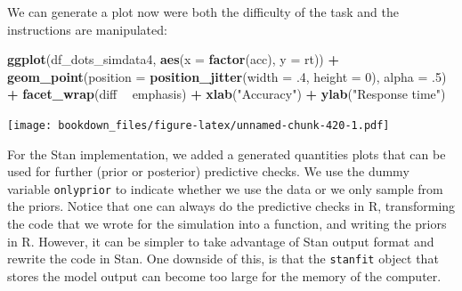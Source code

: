 \documentclass[12pt,]{krantz}
\newenvironment{Shaded}{\begin{snugshade}}{\end{snugshade}}
\newcommand{\KeywordTok}[1]{\textcolor[rgb]{0.13,0.29,0.53}{\textbf{#1}}}
\newcommand{\DataTypeTok}[1]{\textcolor[rgb]{0.13,0.29,0.53}{#1}}
\newcommand{\DecValTok}[1]{\textcolor[rgb]{0.00,0.00,0.81}{#1}}
\newcommand{\FloatTok}[1]{\textcolor[rgb]{0.00,0.00,0.81}{#1}}
\newcommand{\StringTok}[1]{\textcolor[rgb]{0.31,0.60,0.02}{#1}}
\newcommand{\OperatorTok}[1]{\textcolor[rgb]{0.81,0.36,0.00}{\textbf{#1}}}
\newcommand{\NormalTok}[1]{#1}
\theoremstyle{definition}
\theoremstyle{definition}
\theoremstyle{definition}
\theoremstyle{remark}
\begin{document}
We can generate a plot now were both the difficulty of the task and the
instructions are manipulated:

\begin{Shaded}
\begin{Highlighting}[]
\KeywordTok{ggplot}\NormalTok{(df_dots_simdata4, }\KeywordTok{aes}\NormalTok{(}\DataTypeTok{x =} \KeywordTok{factor}\NormalTok{(acc), }\DataTypeTok{y =}\NormalTok{ rt)) }\OperatorTok{+}
\StringTok{  }\KeywordTok{geom_point}\NormalTok{(}\DataTypeTok{position =} \KeywordTok{position_jitter}\NormalTok{(}\DataTypeTok{width =} \FloatTok{.4}\NormalTok{, }\DataTypeTok{height =} \DecValTok{0}\NormalTok{),}
             \DataTypeTok{alpha =} \FloatTok{.5}\NormalTok{) }\OperatorTok{+}
\StringTok{  }\KeywordTok{facet_wrap}\NormalTok{(diff }\OperatorTok{~}\StringTok{ }\NormalTok{emphasis) }\OperatorTok{+}
\StringTok{  }\KeywordTok{xlab}\NormalTok{(}\StringTok{"Accuracy"}\NormalTok{) }\OperatorTok{+}
\StringTok{  }\KeywordTok{ylab}\NormalTok{(}\StringTok{"Response time"}\NormalTok{)}
\end{Highlighting}
\end{Shaded}

\texttt{[image: bookdown\_files/figure-latex/unnamed-chunk-420-1.pdf]}

For the Stan implementation, we added a generated quantities plots that
can be used for further (prior or posterior) predictive checks. We use
the dummy variable \texttt{onlyprior} to indicate whether we use the
data or we only sample from the priors. Notice that one can always do
the predictive checks in R, transforming the code that we wrote for the
simulation into a function, and writing the priors in R. However, it can
be simpler to take advantage of Stan output format and rewrite the code
in Stan. One downside of this, is that the \texttt{stanfit} object that
stores the model output can become too large for the memory of the
computer.
\end{document}
